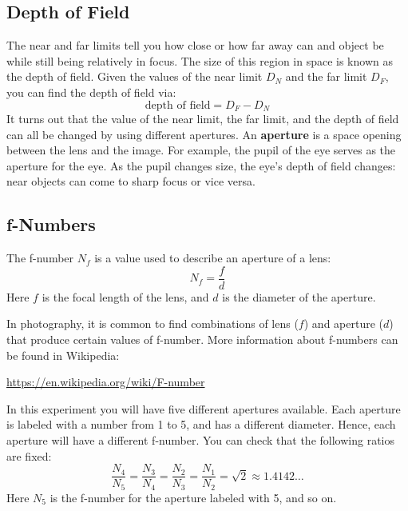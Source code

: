 \subsection{Depth of Field}
The near and far limits tell you how close or how far away can and object be while still being relatively in focus. The size of this region in space is known as the depth of field. Given the values of the near limit $D_{N}$ and the far limit $D_{F}$, you can find the depth of field via:
\begin{equation}
    \text{depth of field} = D_{F} - D_{N}
    \label{eq.09.dof}
\end{equation}
It turns out that the value of the near limit, the far limit, and the depth of field can all be changed by using different apertures. An \textbf{aperture} is a space opening between the lens and the image. For example, the pupil of the eye serves as the aperture for the eye. As the pupil changes size, the eye's depth of field changes: near objects can come to sharp focus or vice versa.
\subsection{f-Numbers}
The f-number $N_{f}$ is a value used to describe an aperture of a lens:
\begin{equation}
    N_{f} = \frac{f}{d}
\end{equation}
Here $f$ is the focal length of the lens, and $d$ is the diameter of the aperture.

In photography, it is common to find combinations of lens ($f$) and aperture ($d$) that produce certain values of f-number. More information about f-numbers can be found in Wikipedia:
\begin{center}
    \url{https://en.wikipedia.org/wiki/F-number}
\end{center}
In this experiment you will have five different apertures available. Each aperture is labeled with a number from 1 to 5, and has a different diameter. Hence, each aperture will have a different f-number. You can check that the following ratios are fixed:
\begin{equation}
    \frac{N_{4}}{N_{5}} = \frac{N_{3}}{N_{4}} = \frac{N_{2}}{N_{3}} = \frac{N_{1}}{N_{2}} = \sqrt{2} \approx 1.4142\ldots
\end{equation}
Here $N_{5}$ is the f-number for the aperture labeled with 5, and so on.

